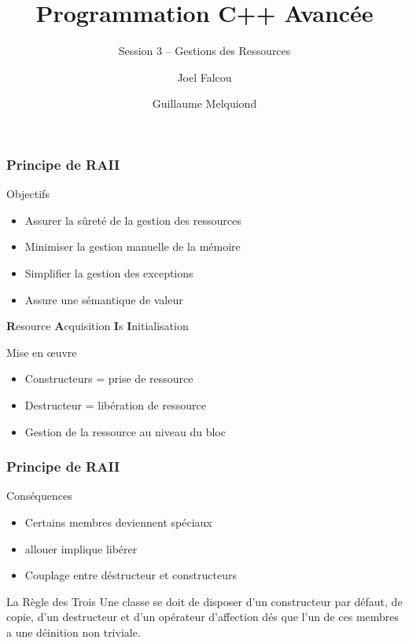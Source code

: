 \documentclass[svgnames]{beamer}
\title{Programmation C++ Avancée}
\subtitle{Session 3 -- Gestions des Ressources}
\author{Joel Falcou \and Guillaume Melquiond}
\institute{Laboratoire de Recherche en Informatique}
\date{}
\begin{document}


\begin{frame}[plain]
\titlepage
\end{frame}
\setcounter{framenumber}{0}

\frame
{
  \frametitle{Principe de RAII}
  \begin{block}{Objectifs}
  \begin{itemize}\footnotesize
  \item Assurer la sûreté de la gestion des ressources
  \item Minimiser la gestion manuelle de la mémoire
  \item Simplifier la gestion des exceptions
  \item Assure une sémantique de valeur
  \end{itemize}
  \end{block}
  
  \begin{center}
  \textbf{R}esource \textbf{A}cquisition \textbf{I}s \textbf{I}nitialisation
  \end{center}

  \begin{block}{Mise en \oe{uvre}}
  \begin{itemize}\footnotesize
  \item Constructeurs = prise de ressource
  \item Destructeur = libération de ressource
  \item Gestion de la ressource au niveau du bloc
  \end{itemize}
  \end{block}
}

\frame
{
  \frametitle{Principe de RAII}
  \begin{block}{Conséquences}
  \begin{itemize}
  \item Certains membres deviennent spéciaux
  \item allouer implique libérer
  \item Couplage entre déstructeur et constructeurs
  \end{itemize}
  \end{block}

  \begin{block}{La Règle des Trois}
  Une classe se doit de disposer d'un constructeur par défaut, de copie,
  d'un destructeur et d'un opérateur d'affection dés que l'un de ces membres 
  a une déinition non triviale.
  \end{block}
}
\end{document}
